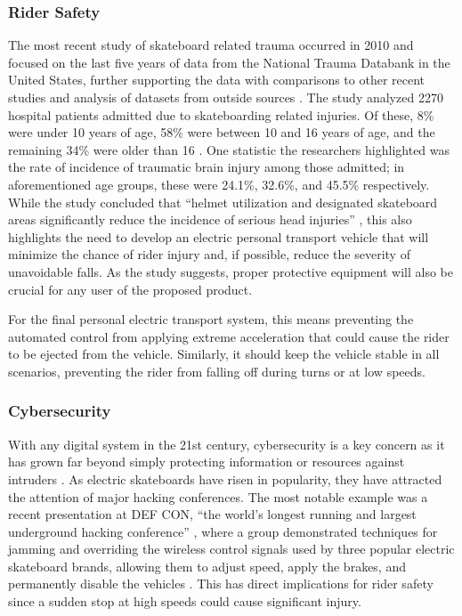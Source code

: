 \subsubsection{Rider Safety}
The most recent study of skateboard related trauma occurred in 2010 and focused on the last five years of data from the National Trauma Databank in the United States, further supporting the data with comparisons to other recent studies and analysis of datasets from outside sources \cite{Injury}. The study analyzed 2270 hospital patients admitted due to skateboarding related injuries. Of these, 8\% were under 10 years of age, 58\% were between 10 and 16 years of age, and the remaining 34\% were older than 16 \cite{Injury}. One statistic the researchers highlighted was the rate of incidence of traumatic brain injury among those admitted; in aforementioned age groups, these were 24.1\%, 32.6\%, and 45.5\% respectively\cite{Injury}. While the study concluded that ``helmet utilization and designated skateboard areas significantly reduce the incidence of serious head injuries'' \cite{Injury}, this also highlights the need to develop an electric personal transport vehicle that will minimize the chance of rider injury and, if possible, reduce the severity of unavoidable falls. As the study suggests, proper protective equipment will also be crucial for any user of the proposed product. 

For the final personal electric transport system, this means preventing the automated control from applying extreme acceleration that could cause the rider to be ejected from the vehicle. Similarly, it should keep the vehicle stable in all scenarios, preventing the rider from falling off during turns or at low speeds.

\subsubsection{Cybersecurity}
With any digital system in the 21st century, cybersecurity is a key concern as it has grown far beyond simply protecting information or resources against intruders \cite{cybersecurity}. As electric skateboards have risen in popularity, they have attracted the attention of major hacking conferences. The most notable example was a recent presentation at DEF CON, ``the world's longest running and largest underground hacking conference'' \cite{DEFCONsite}, where a group demonstrated techniques for jamming and overriding the wireless control signals used by three popular electric skateboard brands, allowing them to adjust speed, apply the brakes, and permanently disable the vehicles \cite{DEFCON,wiredArticle}. This has direct implications for rider safety since a sudden stop at high speeds could cause significant injury. 

